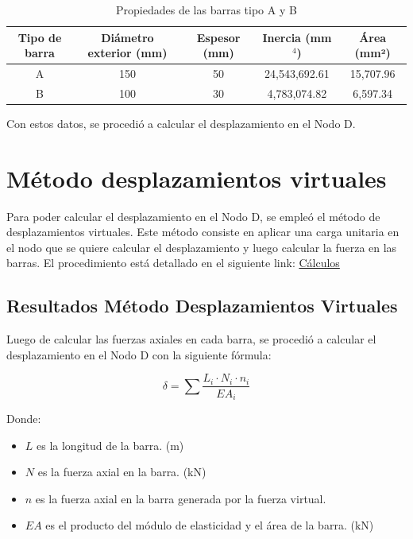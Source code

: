 \documentclass{article}  %
\begin{document}
\begin{table}[h!]
  \centering
  \begin{tabular}{|c|c|c|c|c|}
  \hline
  \textbf{Tipo de barra} & \textbf{Diámetro exterior (mm)} & \textbf{Espesor (mm)} & \textbf{Inercia (mm\(^4\))} & \textbf{Área (mm²)} \\
  \hline
  A  & 150 & 50  & 24,543,692.61 & 15,707.96 \\
  B  & 100 & 30  & 4,783,074.82  & 6,597.34  \\
  \hline
  \end{tabular}
  \caption{Propiedades de las barras tipo A y B}
\end{table}
  
Con estos datos, se procedió a calcular el desplazamiento en el Nodo D.

\newpage
\section{Método desplazamientos virtuales}
Para poder calcular el desplazamiento en el Nodo D, se empleó el método de desplazamientos virtuales. Este método consiste en aplicar una carga unitaria en el nodo que se quiere calcular el desplazamiento y luego calcular la fuerza en las barras. El procedimiento está detallado en el siguiente link: \href{https://github.com/berckanala/P2E0_MCOC/tree/main/Excel}{Cálculos}

\subsection{Resultados Método Desplazamientos Virtuales}

Luego de calcular las fuerzas axiales en cada barra, se procedió a calcular el desplazamiento en el Nodo D con la siguiente fórmula:

\begin{equation}
  \delta = \sum \frac{L_i \cdot N_i \cdot n_i}{EA_i}
  \label{eq:1}
\end{equation}

Donde:
\begin{itemize}
  \item \(L\) es la longitud de la barra. (m)
  \item \(N\) es la fuerza axial en la barra. (kN)
  \item \(n\) es la fuerza axial en la barra generada por la fuerza virtual. 
  \item \(EA\) es el producto del módulo de elasticidad y el área de la barra. (kN)
\end{itemize}
\end{document}
